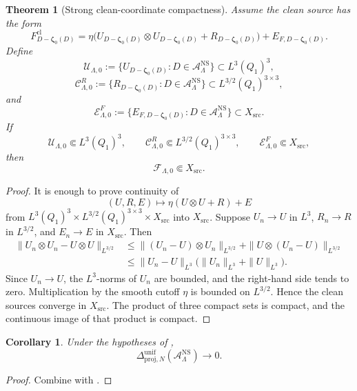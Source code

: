 \documentclass[11pt]{article}
\numberwithin{equation}{section}
\newtheorem{theorem}{Theorem}[section]
\newtheorem{corollary}[corollary]{Corollary}
\theoremstyle{definition}
\theoremstyle{remark}
\newcommand{\NS}{\mathrm{NS}}
\newcommand{\src}{\mathrm{src}}
\newcommand{\cl}{\mathrm{cl}}
\newcommand{\bzeta}{\boldsymbol\zeta}
\begin{document}
\begin{theorem}[Strong clean-coordinate compactness]
\label{thm:strong-coordinate-compactness}
Assume the clean source has the form
\[
    F^{\cl}_{D-\bzeta_0(D)}
    =
    \eta\bigl(
        U_{D-\bzeta_0(D)}\otimes U_{D-\bzeta_0(D)}
        +
        R_{D-\bzeta_0(D)}
    \bigr)
    +
    E_{F,D-\bzeta_0(D)}.
\]
Define
\[
    \mathcal U_{\Lambda,0}
    :=
    \{U_{D-\bzeta_0(D)}:D\in\mathcal A_{\Lambda}^{\NS}\}
    \subset L^3(Q_1)^3,
\]
\[
    \mathcal C_{\Lambda,0}^{R}
    :=
    \{R_{D-\bzeta_0(D)}:D\in\mathcal A_{\Lambda}^{\NS}\}
    \subset L^{3/2}(Q_1)^{3\times3},
\]
and
\[
    \mathcal E_{\Lambda,0}^{F}
    :=
    \{E_{F,D-\bzeta_0(D)}:D\in\mathcal A_{\Lambda}^{\NS}\}
    \subset X_{\src}.
\]
If
\[
    \mathcal U_{\Lambda,0}\Subset L^3(Q_1)^3,
    \qquad
    \mathcal C_{\Lambda,0}^{R}\Subset L^{3/2}(Q_1)^{3\times3},
    \qquad
    \mathcal E_{\Lambda,0}^{F}\Subset X_{\src},
\]
then
\[
    \mathcal F_{\Lambda,0}\Subset X_{\src}.
\]
\end{theorem}

\begin{proof}
It is enough to prove continuity of
\[
    (U,R,E)\longmapsto \eta(U\otimes U+R)+E
\]
from \(L^3(Q_1)^3\times L^{3/2}(Q_1)^{3\times3}\times X_{\src}\) into
\(X_{\src}\).  Suppose \(U_n\to U\) in \(L^3\), \(R_n\to R\) in \(L^{3/2}\),
and \(E_n\to E\) in \(X_{\src}\).  Then
\[
\begin{aligned}
    \|U_n\otimes U_n-U\otimes U\|_{L^{3/2}}
    &\le
    \|(U_n-U)\otimes U_n\|_{L^{3/2}}
    +
    \|U\otimes(U_n-U)\|_{L^{3/2}}\\
    &\le
    \|U_n-U\|_{L^3}
    \bigl(\|U_n\|_{L^3}+\|U\|_{L^3}\bigr).
\end{aligned}
\]
Since \(U_n\to U\), the \(L^3\)-norms of \(U_n\) are bounded, and the right-hand
side tends to zero.  Multiplication by the smooth cutoff \(\eta\) is bounded on
\(L^{3/2}\).  Hence the clean sources converge in \(X_{\src}\).  The product of
three compact sets is compact, and the continuous image of that product is
compact.
\end{proof}

\begin{corollary}
\label{cor:strong-coordinate-tail}
Under the hypotheses of ,
\[
    \Delta_{\mathrm{proj},N}^{\mathrm{unif}}
    (\mathcal A_{\Lambda}^{\NS})\to0.
\]
\end{corollary}

\begin{proof}
Combine  with
.
\end{proof}
\end{document}

